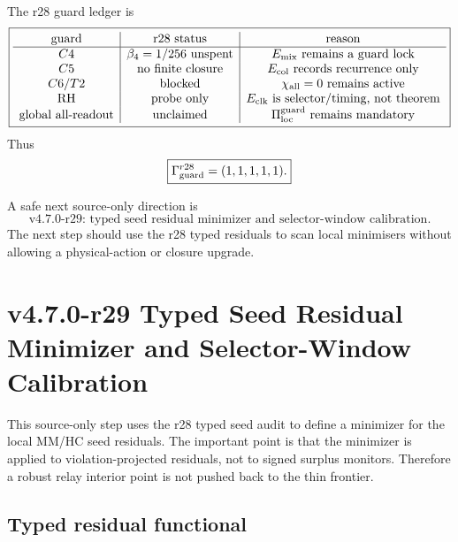The r28 guard ledger is
\[
\boxed{
\begin{array}{c|c|c}
\text{guard} & \text{r28 status} & \text{reason}\\
\hline
C4 & \beta_4=1/256\text{ unspent} & E_{\rm mix}\text{ remains a guard lock}\\
C5 & \text{no finite closure} & E_{\rm col}\text{ records recurrence only}\\
C6/T2 & \text{blocked} & \chi_{\rm all}=0\text{ remains active}\\
\text{RH} & \text{probe only} & E_{\rm clk}\text{ is selector/timing, not theorem}\\
\text{global all-readout} & \text{unclaimed} & \Pi_{\rm loc}^{\rm guard}\text{ remains mandatory}
\end{array}
}
\]
Thus
\[
\boxed{
\Gamma_{\rm guard}^{r28}=(1,1,1,1,1).
}
\]

A safe next source-only direction is
\[
\boxed{
\text{v4.7.0-r29: typed seed residual minimizer and selector-window calibration.}
}
\]
The next step should use the r28 typed residuals to scan local minimisers without
allowing a physical-action or closure upgrade.


\section{v4.7.0-r29 Typed Seed Residual Minimizer and Selector-Window Calibration}
\label{sec:v470-r29-typed-seed-residual-minimizer}

This source-only step uses the r28 typed seed audit to define a minimizer for the
local MM/HC seed residuals.  The important point is that the minimizer is applied
to violation-projected residuals, not to signed surplus monitors.  Therefore a
robust relay interior point is not pushed back to the thin frontier.

\subsection{Typed residual functional}
\label{subsec:v470-r29-typed-residual-functional}

